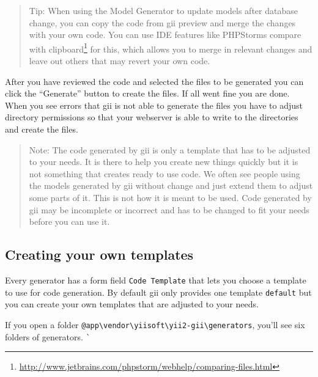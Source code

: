 \begin{quote}Tip: When using the Model Generator to update models after database change, you can copy the code from gii preview
  and merge the changes with your own code. You can use IDE features like PHPStorms
  compare with clipboard\footnote{\url{http://www.jetbrains.com/phpstorm/webhelp/comparing-files.html}} for this,
  which allows you to merge in relevant changes and leave out others that may revert your own code.

\end{quote}
After you have reviewed the code and selected the files to be generated you can click the ``Generate'' button to create
the files. If all went fine you are done. When you see errors that gii is not able to generate the files you have to
adjust directory permissions so that your webserver is able to write to the directories and create the files.

\begin{quote}Note: The code generated by gii is only a template that has to be adjusted to your needs. It is there
  to help you create new things quickly but it is not something that creates ready to use code.
  We often see people using the models generated by gii without change and just extend them to adjust
  some parts of it. This is not how it is meant to be used. Code generated by gii may be incomplete or incorrect
  and has to be changed to fit your needs before you can use it.

\end{quote}
\subsection{Creating your own templates}
Every generator has a form field \lstinline|Code Template| that lets you choose a template to use for code generation.
By default gii only provides one template \lstinline|default| but you can create your own templates that are adjusted to your needs.

If you open a folder \lstinline|@app\vendor\yiisoft\yii2-gii\generators|, you'll see six folders of generators.
\lstinline|`|

